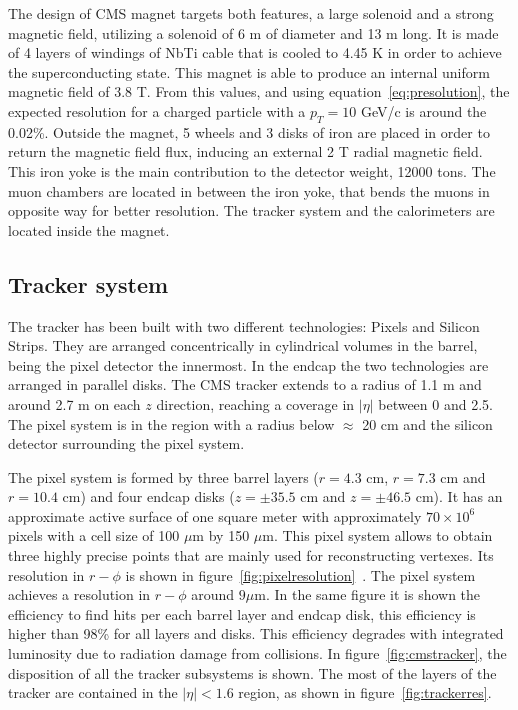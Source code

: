 The design of CMS magnet targets both features, a large solenoid and a strong magnetic field, utilizing a solenoid of 6 m of diameter and 13 m long. It is made of 4 layers of windings of NbTi cable that is cooled to 4.45 K in order to achieve the superconducting state. This magnet is able to produce an internal uniform magnetic field of 3.8 T. From this values, and using equation~\ref{eq:presolution}, the expected resolution for a charged particle with a $p_{T}=10$ GeV/c is around the 0.02\%. Outside the magnet, 5 wheels and 3 disks of iron are placed in order to return the magnetic field flux, inducing an external 2 T radial magnetic field. This iron yoke is the main contribution to the detector weight, 12000 tons. The muon chambers are located in between the iron yoke, that bends the muons in opposite way for better resolution. The tracker system and the calorimeters are located inside the magnet. 

\subsection{Tracker system}
\label{sec:tracker}

The tracker has been built with two different technologies: Pixels and Silicon Strips. They are arranged concentrically in cylindrical volumes in the barrel, being the pixel detector the innermost. In the endcap the two technologies are arranged in parallel disks. The CMS tracker extends to a radius of 1.1 m and around 2.7 m on each $z$ direction, reaching a coverage in $|\eta|$ between 0 and 2.5. The pixel system is in the region with a radius below $\approx$ 20 cm and the silicon detector surrounding the pixel system. %

The pixel system is formed by three barrel layers ($r=4.3$ cm, $r=7.3$ cm and $r=10.4$ cm) and four endcap disks ($z=\pm 35.5$ cm and $z=\pm 46.5$ cm). It has an approximate active surface of one square meter with approximately $70\times10^{6}$ pixels with a cell size of 100 $\mu$m by 150 $\mu$m. This pixel system allows to obtain three highly precise points that are mainly used for reconstructing vertexes. Its resolution in $r-\phi$ is shown in figure~\ref{fig:pixelresolution}~\cite{Brochet:1956723}. The pixel system achieves a resolution in $r-\phi$ around ${9\mu\text{m}}$. In the same figure it is shown the efficiency to find hits per each barrel layer and endcap disk, this efficiency is higher than 98\% for all layers and disks. This efficiency degrades with integrated luminosity due to radiation damage from collisions. In figure~\ref{fig:cmstracker}, the disposition of all the tracker subsystems is shown. The most of the layers of the tracker are contained in the $|\eta|<1.6$ region, as shown in figure~\ref{fig:trackerres}.

